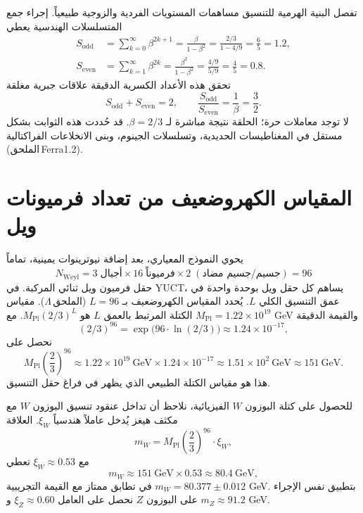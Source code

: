 \documentclass[12pt,a4paper]{article}
\begin{document}
	تفصل البنية الهرمية للتنسيق مساهمات المستويات الفردية والزوجية طبيعياً. إجراء جمع المتسلسلات الهندسية يعطي
	\begin{align}
		S_{\mathrm{odd}} &= \sum_{k=0}^{\infty} \beta^{2k+1} = \frac{\beta}{1-\beta^{2}} = \frac{2/3}{1 - 4/9} = \frac{6}{5} = 1.2, \label{eq:sodd}\\
		S_{\mathrm{even}} &= \sum_{k=1}^{\infty} \beta^{2k} = \frac{\beta^{2}}{1-\beta^{2}} = \frac{4/9}{5/9} = \frac{4}{5} = 0.8. \label{eq:seven}
	\end{align}
	تحقق هذه الأعداد الكسرية الدقيقة علاقات جبرية مغلقة
	\begin{equation}
		\boxed{S_{\mathrm{odd}} + S_{\mathrm{even}} = 2, \qquad \frac{S_{\mathrm{odd}}}{S_{\mathrm{even}}} = \frac{1}{\beta} = \frac{3}{2}}.
		\label{eq:algebraic-loop}
	\end{equation}
	لا توجد معاملات حرة؛ الحلقة نتيجة مباشرة لـ \(\beta = 2/3\). قد حُددت هذه الثوابت بشكل مستقل في المغناطيسات الحديدية، وتسلسلات الجينوم، وبنى الانخلاعات الفراكتالية (الملحق Ferra1.2).
	
	\section{المقياس الكهروضعيف من تعداد فرميونات ويل}
	
	يحوي النموذج المعياري، بعد إضافة نيوترينوات يمينية، تماماً
	\begin{equation}
		N_{\mathrm{Weyl}} = 3\;\text{أجيال} \times 16\;\text{فرميوناً} \times 2\;(\text{جسيم/جسيم مضاد}) = 96
	\end{equation}
	حقل فرميون ويل ثنائي المركبة. في YUCT، يساهم كل حقل ويل بوحدة واحدة في عمق التنسيق الكلي \(L\). يُحدد المقياس الكهروضعيف بـ \(L = 96\) (الملحق \(\Lambda\)). مقياس الكتلة المرتبط بالعمق \(L\) هو \(M_{\mathrm{Pl}} (2/3)^{L}\). مع \(M_{\mathrm{Pl}} = 1.22 \times 10^{19}\) GeV والقيمة الدقيقة
	\begin{equation}
		(2/3)^{96} = \exp\bigl(96 \cdot \ln(2/3)\bigr) \approx 1.24 \times 10^{-17},
	\end{equation}
	نحصل على
	\begin{equation}
		M_{\mathrm{Pl}} \left(\frac{2}{3}\right)^{96} \approx 1.22 \times 10^{19}\ \mathrm{GeV} \times 1.24 \times 10^{-17} \approx 1.51 \times 10^{2}\ \mathrm{GeV} \approx 151\ \mathrm{GeV}.
	\end{equation}
	هذا هو مقياس الكتلة الطبيعي الذي يظهر في فراغ حقل التنسيق.
	
	للحصول على كتلة البوزون \(W\) الفيزيائية، نلاحظ أن تداخل عنقود تنسيق البوزون \(W\) مع مكثف هيغز يُدخل عاملاً هندسياً \(\xi_W\). العلاقة
	\begin{equation}
		m_W = M_{\mathrm{Pl}} \left(\frac{2}{3}\right)^{96} \cdot \xi_W,
		\label{eq:mw}
	\end{equation}
	مع \(\xi_W \approx 0.53\) تعطي
	\begin{equation}
		m_W \approx 151\ \mathrm{GeV} \times 0.53 \approx 80.4\ \mathrm{GeV},
	\end{equation}
	في تطابق ممتاز مع القيمة التجريبية \(m_W = 80.377 \pm 0.012\) GeV. بتطبيق نفس الإجراء على البوزون \(Z\) نحصل على العامل \(\xi_Z \approx 0.60\) و \(m_Z \approx 91.2\) GeV.
	
\end{document}
